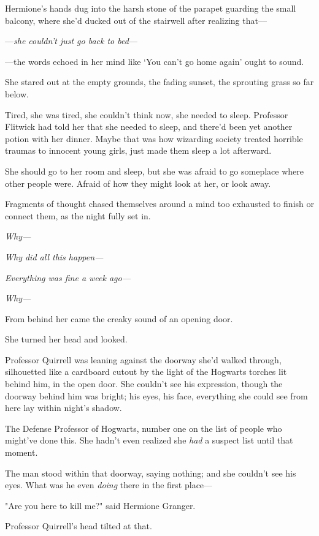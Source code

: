 Hermione's hands dug into the harsh stone of the parapet guarding the small
balcony, where she'd ducked out of the stairwell after realizing that---

---\emph{she couldn't just go back to bed}---

---the words echoed in her mind like `You can't go home again' ought to sound.

She stared out at the empty grounds, the fading sunset, the sprouting grass so
far below.

Tired, she was tired, she couldn't think now, she needed to sleep. Professor
Flitwick had told her that she needed to sleep, and there'd been yet another
potion with her dinner. Maybe that was how wizarding society treated horrible
traumas to innocent young girls, just made them sleep a lot afterward.

She should go to her room and sleep, but she was afraid to go someplace where
other people were. Afraid of how they might look at her, or look away.

Fragments of thought chased themselves around a mind too exhausted to finish or
connect them, as the night fully set in.

\emph{Why---}

\emph{Why did all this happen---}

\emph{Everything was fine a week ago---}

\emph{Why---}

From behind her came the creaky sound of an opening door.

She turned her head and looked.

Professor Quirrell was leaning against the doorway she'd walked through,
silhouetted like a cardboard cutout by the light of the Hogwarts torches lit
behind him, in the open door. She couldn't see his expression, though the
doorway behind him was bright; his eyes, his face, everything she could see
from here lay within night's shadow.

The Defense Professor of Hogwarts, number one on the list of people who
might've done this. She hadn't even realized she \emph{had} a suspect list
until that moment.

The man stood within that doorway, saying nothing; and she couldn't see his
eyes. What was he even \emph{doing} there in the first place---

"Are you here to kill me?" said Hermione Granger.

Professor Quirrell's head tilted at that.

